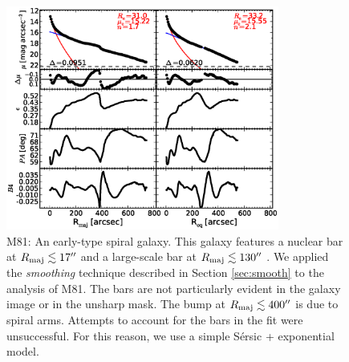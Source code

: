 \documentclass[preprint2]{emulateapj}
\newcommand{\fitfigurewidth}{0.8\textwidth}
\begin{document}
  \begin{figure}[h]
  \begin{center}
  \includegraphics[width=\fitfigurewidth]{images/m81_1Dfit.eps}
  \caption{M81: 
  An early-type spiral galaxy.
  This galaxy features a nuclear bar at $R_{\rm maj} \lesssim 17''$ and a large-scale bar at $R_{\rm maj} \lesssim 130''$ 
  \citep{elmegreen1995m81,gutierrez2011,erwindebattista2013}. 
  We applied the \emph{smoothing} technique described in Section \ref{sec:smooth} to the analysis of M81.
  The bars are not particularly evident in the galaxy image or in the unsharp mask. 
  The bump at $R_{\rm maj} \lesssim 400''$ is due to spiral arms. 
  Attempts to account for the bars in the fit were unsuccessful. 
  For this reason, we use a simple S\'ersic + exponential model. 
  }
  \end{center}
  \end{figure}
\end{document}
